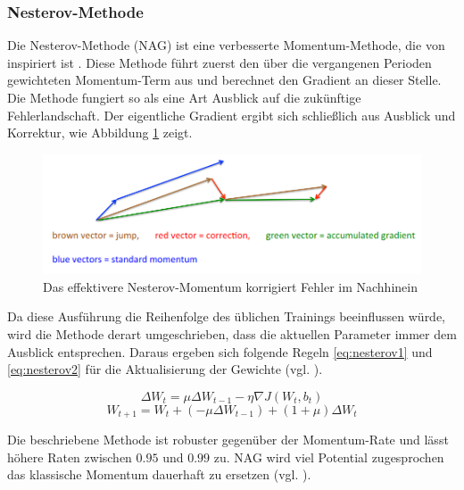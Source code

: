 \subsubsection{Nesterov-Methode}
Die Nesterov-Methode (NAG) ist eine verbesserte Momentum-Methode, die von \cite{Nesterov1983} inspiriert ist \cite[vgl. im Folgenden][]{Sutskever2013b}. Diese Methode führt zuerst den über die vergangenen Perioden gewichteten Momentum-Term aus und berechnet den Gradient an dieser Stelle. Die Methode fungiert so als eine Art Ausblick auf die zukünftige Fehlerlandschaft. Der eigentliche Gradient ergibt sich schließlich aus Ausblick und Korrektur, wie Abbildung \ref{fig:4_nesterov} zeigt.
\begin{figure}
\centering
\includegraphics[width=0.7\linewidth]{images/4_nesterov}
\caption[]{Das effektivere Nesterov-Momentum korrigiert Fehler im Nachhinein\cite[siehe][]{Hinton2015} }%
\label{fig:4_nesterov}
\end{figure}

Da diese Ausführung die Reihenfolge des üblichen Trainings beeinflussen würde, wird die Methode derart umgeschrieben, dass die aktuellen Parameter immer dem Ausblick entsprechen. Daraus ergeben sich folgende Regeln \ref{eq:nesterov1} und \ref{eq:nesterov2} für die Aktualisierung der Gewichte (vgl. \cite{Kaparthy2014}).


\begin{equation}
\label{eq:nesterov1} 
\Delta W_t = \mu \Delta W_{t-1} - \eta  \nabla J(W_t,b_t)
\end{equation}
\begin{equation}
\label{eq:nesterov2} 
W_{t+1} = W_t + (-\mu \Delta W_{t-1} ) + (1 + \mu) \Delta W_t
\end{equation}

Die beschriebene Methode ist robuster gegenüber der Momentum-Rate und lässt höhere Raten zwischen $0.95$ und $0.99$ zu. NAG wird viel Potential zugesprochen das klassische Momentum dauerhaft zu ersetzen (vgl. \cite{Sutskever2013}).


